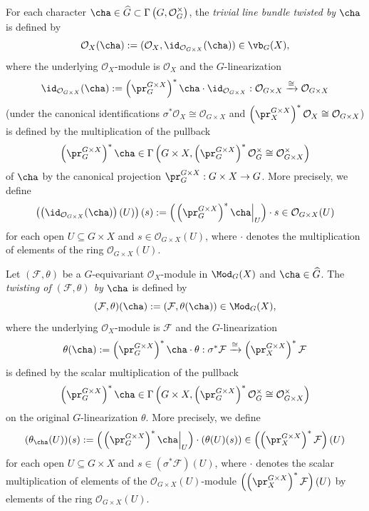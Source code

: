 \begin{defn}


For each character
$\cha \in \widehat{G}\subset\Gamma\left(G, \mathcal{O}_G^\times\right)$,
the \emph{trivial line bundle twisted by $\cha$}
is defined by
$$
\mathcal{O}_X(\cha)
:=
(\mathcal{O}_X, \id_{\mathcal{O}_{G\times X}}(\cha))
\in \vb_G(X),
$$
where the underlying $\mathcal{O}_X$-module is $\mathcal{O}_X$
and the $G$-linearization
$$
\id_{\mathcal{O}_{G\times X}}(\cha)
:=
\left(\pr_G^{G \times X}\right)^* \cha \cdot \id_{\mathcal{O}_{G\times X}}
:
\mathcal{O}_{G\times X}
\xrightarrow{\cong}
\mathcal{O}_{G\times X}
$$
(under the canonical identifications
$
\sigma^* \mathcal{O}_X
\cong
\mathcal{O}_{G\times X}
$
and
$
\left(\pr_X^{G \times X}\right)^* \mathcal{O}_X
\cong
\mathcal{O}_{G\times X}
$)
is defined by
the multiplication of
the pullback
$$
\left(\pr_G^{G \times X}\right)^* \cha
\in
\Gamma\left(G \times X, \left(\pr_G^{G\times X}\right)^*\mathcal{O}_G^\times \cong \mathcal{O}_{G \times X}^\times\right)
$$
of $\cha$ by the canonical projection
$\pr_G^{G\times X}:G\times X\rightarrow G$.
More precisely,
we define
$$
\left(\left(\id_{\mathcal{O}_{G\times X}}(\cha)\right)(U)\right)(s)
:=
\left(\left.\left(\pr_G^{G \times X}\right)^* \cha\right|_U\right)
\cdot
s
\in
\mathcal{O}_{G\times X}(U)
$$
for each open
$U\subseteq G\times X$
and
$s\in\mathcal{O}_{G\times X}(U)$,
where
$\cdot$ denotes the multiplication of elements of the ring
$\mathcal{O}_{G\times X}(U)$.




Let $(\mathcal{F}, \theta)$ be a $G$-equivariant $\mathcal{O}_X$-module in $\Mod_G(X)$ and $\cha \in \widehat{G}$.
The \emph{twisting of $(\mathcal{F},\theta)$ by $\cha$}
is defined by
$$
(\mathcal{F},\theta)(\cha)
:=
(\mathcal{F}, \theta(\cha))
\in \Mod_G(X),
$$
where the underlying $\mathcal{O}_X$-module is $\mathcal{F}$
and the $G$-linearization
$$
\theta(\cha)
:=
\left(\pr_G^{G \times X}\right)^* \cha \cdot \theta
:
\sigma^* \mathcal{F}
\xrightarrow{\cong}
\left(\pr_X^{G \times X}\right)^* \mathcal{F}
$$
is defined by the scalar multiplication of
the pullback
$$
\left(\pr_G^{G \times X}\right)^* \cha
\in
\Gamma\left(G \times X, \left(\pr_G^{G\times X}\right)^*\mathcal{O}_G^\times \cong \mathcal{O}_{G \times X}^\times\right)
$$
on the original $G$-linearization $\theta$.
More precisely,
we define
$$
(\theta_{\cha}(U))(s)
:=
\left(\left.\left(\pr_G^{G \times X}\right)^* \cha\right|_U\right)
\cdot
(\theta(U)(s))
\in
\left(\left(\pr_X^{G \times X}\right)^*\mathcal{F}\right)(U)
$$
for each open
$U\subseteq G\times X$
and
$s\in(\sigma^*\mathcal{F})(U)$,
where
$\cdot$ denotes the scalar multiplication of elements of the $\mathcal{O}_{G\times X}(U)$-module
$\left(\left(\pr_X^{G \times X}\right)^*\mathcal{F}\right)(U)$
by elements of the ring $\mathcal{O}_{G\times X}(U)$.











\end{defn}
